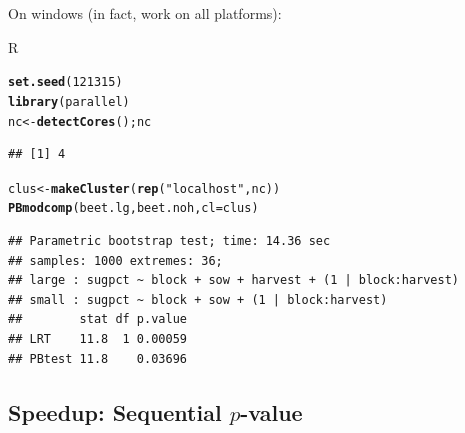 \documentclass[compress]{beamer}\usepackage[]{graphicx}\usepackage[]{color}
\makeatletter
\newcommand{\hlnum}[1]{\textcolor[rgb]{0.686,0.059,0.569}{#1}}%
\newcommand{\hlstr}[1]{\textcolor[rgb]{0.192,0.494,0.8}{#1}}%
\newcommand{\hlstd}[1]{\textcolor[rgb]{0.345,0.345,0.345}{#1}}%
\newcommand{\hlkwb}[1]{\textcolor[rgb]{0.69,0.353,0.396}{#1}}%
\newcommand{\hlkwc}[1]{\textcolor[rgb]{0.333,0.667,0.333}{#1}}%
\newcommand{\hlkwd}[1]{\textcolor[rgb]{0.737,0.353,0.396}{\textbf{#1}}}%
\newenvironment{kframe}{%
 \def\at@end@of@kframe{}%
 \ifinner\ifhmode%
  \def\at@end@of@kframe{\end{minipage}}%
  \begin{minipage}{\columnwidth}%
 \fi\fi%
 \def\FrameCommand##1{\hskip\@totalleftmargin \hskip-\fboxsep
 \colorbox{shadecolor}{##1}\hskip-\fboxsep
     \hskip-\linewidth \hskip-\@totalleftmargin \hskip\columnwidth}%
 \MakeFramed {\advance\hsize-\width
   \@totalleftmargin\z@ \linewidth\hsize
   \@setminipage}}%
 {\par\unskip\endMakeFramed%
 \at@end@of@kframe}
\newenvironment{knitrout}{}{} %
\newenvironment{sframe}
{\begin{frame} [containsverbatim] }
  {\end{frame}}
\newenvironment{sblock}
{\begin{block}{R}}
  {\end{block}}
\makeatother
\begin{document}
\begin{sframe}

On windows (in fact, work on all platforms):


   
\begin{sblock}
\begin{knitrout}\scriptsize
{}\color{fgcolor}\begin{kframe}
\begin{alltt}
\hlkwd{set.seed}\hlstd{(}\hlnum{121315}\hlstd{)}
\hlkwd{library}\hlstd{(parallel)}
\hlstd{nc} \hlkwb{<-} \hlkwd{detectCores}\hlstd{(); nc}
\end{alltt}
\begin{verbatim}
## [1] 4
\end{verbatim}
\begin{alltt}
\hlstd{clus} \hlkwb{<-} \hlkwd{makeCluster}\hlstd{(}\hlkwd{rep}\hlstd{(}\hlstr{"localhost"}\hlstd{, nc))}
\hlkwd{PBmodcomp}\hlstd{(beet.lg, beet.noh,} \hlkwc{cl}\hlstd{=clus)}
\end{alltt}
\begin{verbatim}
## Parametric bootstrap test; time: 14.36 sec
## samples: 1000 extremes: 36;
## large : sugpct ~ block + sow + harvest + (1 | block:harvest)
## small : sugpct ~ block + sow + (1 | block:harvest)
##        stat df p.value
## LRT    11.8  1 0.00059
## PBtest 11.8    0.03696
\end{verbatim}
\end{kframe}
\end{knitrout}
\end{sblock}  
\end{sframe}







\subsection{Speedup: Sequential $p$-value}
\label{sec:seqp}
\end{document}
